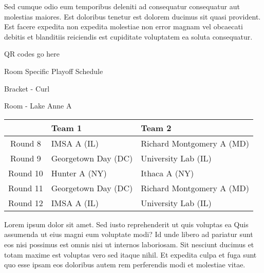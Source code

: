 \documentclass{article}%
\begin{document}
\newline%
Sed cumque odio eum temporibus deleniti ad consequatur consequatur aut molestias maiores. Est doloribus tenetur est dolorem ducimus sit quasi provident. Est facere expedita non expedita molestiae non error magnam vel obcaecati debitis et blanditiis reiciendis est cupiditate voluptatem ea soluta consequatur.%
\vspace*{140pt}%
\begin{center}%
\begin{Huge}%
QR codes go here%
\end{Huge}%
\end{center}%
\newpage%
\begin{center}%
\begin{Huge}%
Room Specific Playoff Schedule%
\end{Huge}%
\vspace*{8pt}%
\linebreak%
\begin{Large}%
Bracket {-} Curl%
\end{Large}%
\vspace*{8pt}%
\linebreak%
\vspace*{8pt}%
\begin{Large}%
Room {-} Lake Anne A%
\end{Large}%
\end{center}%
%
\begin{tabularx}{\textwidth}{|c|Y|Y|}%
\hline%
&Team 1&Team 2\\%
\hline%
Round 8&IMSA A (IL)&Richard Montgomery A (MD)\\%
Round 9&Georgetown Day (DC)&University Lab (IL)\\%
Round 10&Hunter A (NY)&Ithaca A (NY)\\%
Round 11&Georgetown Day (DC)&Richard Montgomery A (MD)\\%
Round 12&IMSA A (IL)&University Lab (IL)\\%
\hline%
\end{tabularx}%
\vspace*{8pt}%
\newline%
Lorem ipsum dolor sit amet. Sed iusto reprehenderit ut quis voluptas ea Quis assumenda ut eius magni eum voluptate modi? Id unde libero ad pariatur sunt eos nisi possimus est omnis nisi ut internos laboriosam. Sit nesciunt ducimus et totam maxime est voluptas vero sed itaque nihil. Et expedita culpa et fuga sunt quo esse ipsam eos doloribus autem rem perferendis modi et molestiae vitae.\newline%
\end{document}
